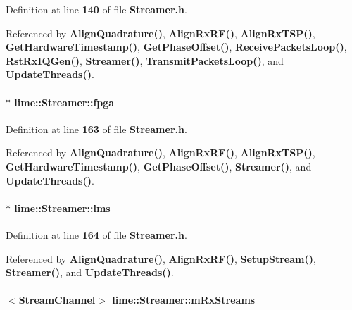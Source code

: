 Definition at line {\bf 140} of file {\bf Streamer.\+h}.



Referenced by {\bf Align\+Quadrature()}, {\bf Align\+Rx\+R\+F()}, {\bf Align\+Rx\+T\+S\+P()}, {\bf Get\+Hardware\+Timestamp()}, {\bf Get\+Phase\+Offset()}, {\bf Receive\+Packets\+Loop()}, {\bf Rst\+Rx\+I\+Q\+Gen()}, {\bf Streamer()}, {\bf Transmit\+Packets\+Loop()}, and {\bf Update\+Threads()}.

\paragraph[{fpga}]{$\ast$ lime\+::\+Streamer\+::fpga\hspace{0.3cm}{\ttfamily [private]}}\label{classlime_1_1Streamer_a729560ce9527503e12f21c64e6e5d781}


Definition at line {\bf 163} of file {\bf Streamer.\+h}.



Referenced by {\bf Align\+Quadrature()}, {\bf Align\+Rx\+R\+F()}, {\bf Align\+Rx\+T\+S\+P()}, {\bf Get\+Hardware\+Timestamp()}, {\bf Get\+Phase\+Offset()}, {\bf Streamer()}, and {\bf Update\+Threads()}.

\paragraph[{lms}]{$\ast$ lime\+::\+Streamer\+::lms\hspace{0.3cm}{\ttfamily [private]}}\label{classlime_1_1Streamer_acccfcc9efdf3f4b3df92860e8daa92cb}


Definition at line {\bf 164} of file {\bf Streamer.\+h}.



Referenced by {\bf Align\+Quadrature()}, {\bf Align\+Rx\+R\+F()}, {\bf Setup\+Stream()}, {\bf Streamer()}, and {\bf Update\+Threads()}.

\paragraph[{m\+Rx\+Streams}]{$<${\bf Stream\+Channel}$>$ lime\+::\+Streamer\+::m\+Rx\+Streams}\label{classlime_1_1Streamer_a9f1b1c40c42bc8a02dfde53d9596cd96}



